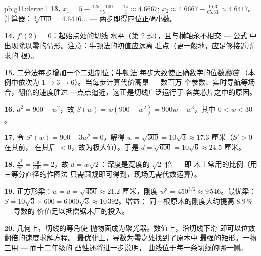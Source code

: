 \begin{solution}{pb:g11:deriv:1}
\textbf{13.} $x_1 = 5 - \frac{125 - 100}{75} = \frac{14}{3}
\approx 4.6667$; $x_2 \approx 4.6667 - \frac{1.63}{65.33}
\approx 4.6417$。计算器：$\sqrt[3]{100} = 4.6416\ldots$ ---
两步即得四位正确小数。

\textbf{14.} $f'(2) = 0$：起始点处的切线
水平（第 2 题），且与横轴永不相交 --- 公式
中出现除以零的情形。注意：牛顿法的初值应远离
驻点（更一般地，应足够接近所求的
根）。

\textbf{15.} 二分法每步增加一个二进制位；牛顿法
每步大致使正确数字的位数\emph{翻倍}
（本例中依次为 $1 \to 3 \to 6$）。当每步计算代价高昂 --- 数百万
个参数、实时导航等场合，翻倍的速度胜过
一点点逼近，这正是切线广泛运行于
各类芯片之中的原因。

\textbf{16.} $d^2 = 900 - w^2$，故
$S(w) = w(900 - w^2) = 900w - w^3$，其中 $0 < w < 30$。

\textbf{17.} 令 $S'(w) = 900 - 3w^2 = 0$，解得
$w = \sqrt{300} = 10\sqrt3 \approx 17.3$ 厘米（$S' > 0$ 在其前，
在其后 $< 0$，故为极大值）。于是
$d = \sqrt{600} = 10\sqrt6 \approx 24.5$ 厘米。

\textbf{18.} $\frac{d^2}{w^2} = \frac{600}{300} = 2$，故
$d = w\sqrt2$：深度是宽度的 $\sqrt2$ 倍 --- 即
木工常用的比例（用三等分直径的作图法
只需圆规即可得到，现场无需代数运算）。

\textbf{19.} 正方形梁：$w = d = \sqrt{450} \approx 21.2$
厘米，刚度 $w^3 = 450^{3/2} \approx 9\,546$。最优梁：
$S = 10\sqrt3 \times 600 = 6\,000\sqrt3 \approx 10\,392$。增益：
同一根原木的刚度大约提高 $8.9\,\%$ --- 导数的
价值足以抵偿锯木厂的投入。

\textbf{20.} 几何上，切线的等角使
抛物面成为聚光器。数值上，沿切线下滑
即可以位数翻倍的速度求解方程。
最优化上，导数为零之处找到了原木中
最强的矩形。一物三用 --- 而十二年级的
凸性还将进一步说明，
曲线位于每一条切线的哪一侧。
\end{solution}
